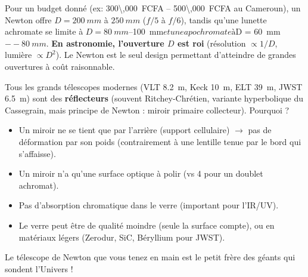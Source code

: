 \documentclass[11pt]{article}
\begin{document}
\begin{aretenir}
Pour un budget donné (ex: \SI{300\,000}{FCFA} -- \SI{500\,000}{FCFA} au Cameroun), un Newton offre $D = \SI{200}{mm}$ à $\SI{250}{mm}$ ($f/5$ à $f/6$), tandis qu'une lunette achromate se limite à $D = \SI{80}{mm}$--\SI{100}{mm}$ et une apochromate à $D = \SI{60}{mm}$--\SI{80}{mm}$. \textbf{En astronomie, l'ouverture $D$ est roi} (résolution $\propto 1/D$, lumière $\propto D^2$). Le Newton est le seul design permettant d'atteindre de grandes ouvertures à coût raisonnable.
\end{aretenir}

\begin{savaistu}
Tous les grands télescopes modernes (VLT \SI{8,2}{m}, Keck \SI{10}{m}, ELT \SI{39}{m}, JWST \SI{6,5}{m}) sont des \textbf{réflecteurs} (souvent Ritchey-Chrétien, variante hyperbolique du Cassegrain, mais principe de Newton : miroir primaire collecteur). Pourquoi ?
\begin{itemize}
    \item Un miroir ne se tient que par l'arrière (support cellulaire) $\to$ pas de déformation par son poids (contrairement à une lentille tenue par le bord qui s'affaisse).
    \item Un miroir n'a qu'une surface optique à polir (vs 4 pour un doublet achromat).
    \item Pas d'absorption chromatique dans le verre (important pour l'IR/UV).
    \item Le verre peut être de qualité moindre (seule la surface compte), ou en matériaux légers (Zerodur, SiC, Béryllium pour JWST).
\end{itemize}
Le télescope de Newton que vous tenez en main est le petit frère des géants qui sondent l'Univers !
\end{savaistu}
\end{document}
